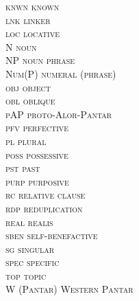 \begin{multicols}{2}
\begin{tabbing}
\scshape knwn \> known\\
\scshape lnk \> linker\\
\scshape loc \> locative\\
\scshape N \> noun\\
\scshape NP \> noun phrase\\
\scshape Num(P) \> numeral (phrase)\\
\scshape obj \> object\\
\scshape obl \> oblique\\
\scshape \rm pAP \> proto-Alor-Pantar\\
\scshape pfv \> perfective\\
\scshape pl \> plural\\
\scshape poss \> possessive\\ 
\scshape pst \> past\\
\scshape purp \> purposive\\
\scshape rc \> relative clause\\
\scshape rdp \> reduplication\\
\scshape real \> realis\\
\scshape sben \> self-benefactive\\
\scshape sg \> singular\\
\scshape spec \> specific\\
\scshape top \> topic\\
\scshape W \rm (Pantar) \> Western Pantar \\
\end{tabbing}
\end{multicols}












